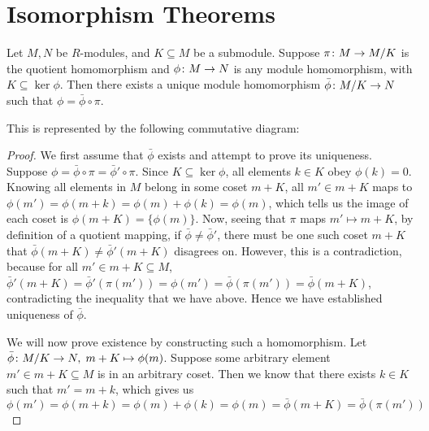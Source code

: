 \section{Isomorphism Theorems}

\begin{theorem}\label{thm:univ-prop-quotient-mod}
    Let \(M,N\) be \(R\)-modules, and \(K \subseteq M\) be a submodule.
    Suppose \(\pi\colon M\to M/K\) is the quotient homomorphism
    and \(\phi\colon M\to N\) is any module homomorphism, with \(K \subseteq \ker\phi\).
    Then there exists a unique module homomorphism \(\bar{\phi}\colon M/K\to N\)
    such that \(\phi = \bar{\phi}\circ\pi\).

    This is represented by the following commutative diagram:
    \begin{center}
    \end{center}
\end{theorem}
\begin{proof}
    We first assume that \(\bar{\phi}\) exists and attempt to prove its uniqueness.
    Suppose \(\phi = \bar{\phi}\circ\pi = \bar{\phi}'\circ\pi\).
    Since \(K \subseteq \ker\phi\),
    all elements \(k \in K\) obey \(\phi(k) = 0\).
    Knowing all elements in \(M\) belong in some coset \(m+K\),
    all \(m' \in m+K\) maps to \(\phi(m') = \phi(m+k) = \phi(m) + \phi(k) = \phi(m)\),
    which tells us the image of each coset is \(\phi(m+K) = \{\phi(m)\}\).
    Now, seeing that \(\pi\) maps \(m' \mapsto m+K\),
    by definition of a quotient mapping,
    if \(\bar{\phi}\neq\bar{\phi}'\),
    there must be one such coset \(m+K\) that
    \(\bar{\phi}(m+K) \neq \bar{\phi}'(m+K)\) disagrees on.
    However, this is a contradiction,
    because for all \(m' \in m+K \subseteq M\),
    \(\bar{\phi}'(m+K) = \bar{\phi}'(\pi(m')) = \phi(m') = \bar{\phi}(\pi(m')) = \bar{\phi}(m+K)\),
    contradicting the inequality that we have above.
    Hence we have established uniqueness of \(\bar{\phi}\).

    We will now prove existence by constructing such a homomorphism.
    Let \(\bar{\phi}\colon M/K\to N,\;m+K\mapsto\phi(m)\).
    Suppose some arbitrary element \(m' \in m+K \subseteq M\) is in an arbitrary coset.
    Then we know that there exists \(k \in K\) such that \(m' = m+k\),
    which gives us
    \begin{equation*}
        \phi(m') = \phi(m+k) = \phi(m)+\phi(k) = \phi(m)
        = \bar{\phi}(m+K) = \bar{\phi}(\pi(m'))
    \end{equation*}
\end{proof}

